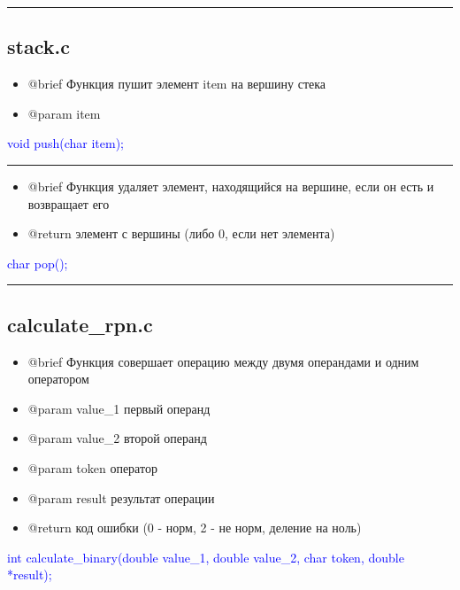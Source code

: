 \documentclass{article}
\begin{document}
{\color{red} \rule{\linewidth}{0.5mm}}

\subsection{\textbf{stack.c}}

\begin{itemize}

\item @brief Функция пушит элемент item на вершину стека

\item @param item 
\end{itemize}

\textcolor{blue}{void push(char item);}


{\color{red} \rule{\linewidth}{0.5mm}}

\begin{itemize}
\item @brief Функция удаляет элемент, находящийся на вершине, если он есть и возвращает его

\item @return элемент с вершины (либо 0, если нет элемента)
\end{itemize}

\textcolor{blue}{char pop();}

{\color{red} \rule{\linewidth}{0.5mm}}

\subsection{\textbf{calculate\_rpn.c}}

\begin{itemize}
\item @brief Функция совершает операцию между двумя операндами и одним оператором

\item @param value\_1 первый операнд

\item @param value\_2 второй операнд

\item @param token оператор

\item @param result результат операции

\item @return код ошибки (0 - норм, 2 - не норм, деление на ноль)
\end{itemize}

\textcolor{blue}{int calculate\_binary(double value\_1, double value\_2, char token,
                     double *result);}
\end{document}
